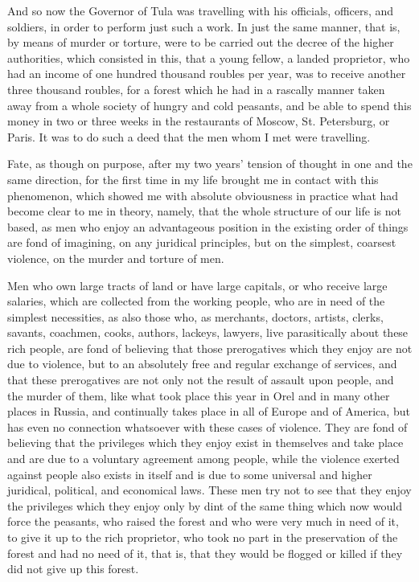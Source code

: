 \documentclass{book}
\begin{document}
And so now the Governor of Tula was travelling with his officials, officers, and soldiers, in order to perform just such a work. In just the same manner, that is, by means of murder or torture, were to be carried out the decree of the higher authorities, which consisted in this, that a young fellow, a landed proprietor, who had an income of one hundred thousand roubles per year, was to receive another three thousand roubles, for a forest which he had in a rascally manner taken away from a whole society of hungry and cold peasants, and be able to spend this money in two or three weeks in the restaurants of Moscow, St. Petersburg, or Paris. It was to do such a deed that the men whom I met were travelling.

Fate, as though on purpose, after my two years’ tension of thought in one and the same direction, for the first time in my life brought me in contact with this phenomenon, which showed me with absolute obviousness in practice what had become clear to me in theory, namely, that the whole structure of our life is not based, as men who enjoy an advantageous position in the existing order of things are fond of imagining, on any juridical principles, but on the simplest, coarsest violence, on the murder and torture of men.

Men who own large tracts of land or have large capitals, or who receive large salaries, which are collected from the working people, who are in need of the simplest necessities, as also those who, as merchants, doctors, artists, clerks, savants, coachmen, cooks, authors, lackeys, lawyers, live parasitically about these rich people, are fond of believing that those prerogatives which they enjoy are not due to violence, but to an absolutely free and regular exchange of services, and that these prerogatives are not only not the result of assault upon people, and the murder of them, like what took place this year in Orel and in many other places in Russia, and continually takes place in all of Europe and of America, but has even no connection whatsoever with these cases of violence. They are fond of believing that the privileges which they enjoy exist in themselves and take place and are due to a voluntary agreement among people, while the violence exerted against people also exists in itself and is due to some universal and higher juridical, political, and economical laws. These men try not to see that they enjoy the privileges which they enjoy only by dint of the same thing which now would force the peasants, who raised the forest and who were very much in need of it, to give it up to the rich proprietor, who took no part in the preservation of the forest and had no need of it, that is, that they would be flogged or killed if they did not give up this forest.
\end{document}
